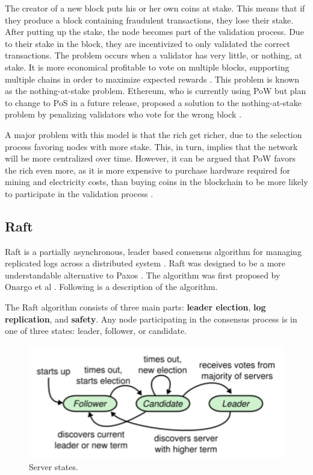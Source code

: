 The creator of a new block puts his or her own coins at stake. This means that if they produce a block containing fraudulent transactions, they lose their stake. After putting up the stake, the node becomes part of the validation process. Due to their stake in the block, they are incentivized to only validated the correct transactions. The problem occurs when a validator has very little, or nothing, at stake. It is more economical profitable to vote on multiple blocks, supporting multiple chains in order to maximize expected rewards \cite{understanding_consensus, Li_pos}. This problem is known as the nothing-at-stake problem. Ethereum, who is currently using PoW but plan to change to PoS in a future release, proposed a solution to the nothing-at-stake problem by penalizing validators who vote for the wrong block \cite{ethereum_wiki}. 

A major problem with this model is that the rich get richer, due to the selection process favoring nodes with more stake. This, in turn, implies that the network will be more centralized over time. However, it can be argued \cite{rich2} that PoW favors the rich even more, as it is more expensive to purchase hardware required for mining and electricity costs, than buying coins in the blockchain to be more likely to participate in the validation process \cite{rich}.

\subsection{Raft}
Raft is a partially asynchronous, leader based consensus algorithm for managing replicated logs across a distributed system \cite{raft}. Raft was designed to be a more understandable alternative to Paxos \cite{paxos}. The algorithm was first proposed by Onargo et al \cite{raft}. Following is a description of the algorithm.

The Raft algorithm consists of three main parts: \textbf{leader election}, \textbf{log replication}, and \textbf{safety}. Any node participating in the consensus process is in one of three states: leader, follower, or candidate.

\begin{figure}[ht]
    \centering
    \includegraphics[width=1\textwidth]{Images/raft_state}
    \caption{Server states. \cite{raft}}
    \label{fig:raft_state}
\end{figure}

